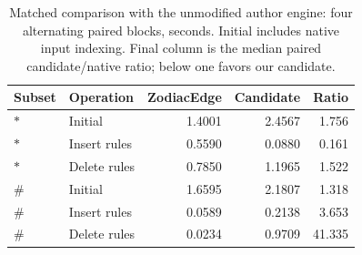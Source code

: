 \begin{table}[ht]
\caption{Matched comparison with the unmodified author engine: four alternating paired blocks, seconds. Initial includes native input indexing. Final column is the median paired candidate/native ratio; below one favors our candidate.}
\label{tab:zodiac-native}
\centering\small
\begin{tabular}{@{}llrrr@{}}
\toprule
Subset & Operation & ZodiacEdge & Candidate & Ratio \\
\midrule
$\ast$ & Initial & 1.4001 & 2.4567 & 1.756 \\
$\ast$ & Insert rules & 0.5590 & 0.0880 & 0.161 \\
$\ast$ & Delete rules & 0.7850 & 1.1965 & 1.522 \\
$\#$ & Initial & 1.6595 & 2.1807 & 1.318 \\
$\#$ & Insert rules & 0.0589 & 0.2138 & 3.653 \\
$\#$ & Delete rules & 0.0234 & 0.9709 & 41.335 \\
\bottomrule
\end{tabular}
\end{table}
